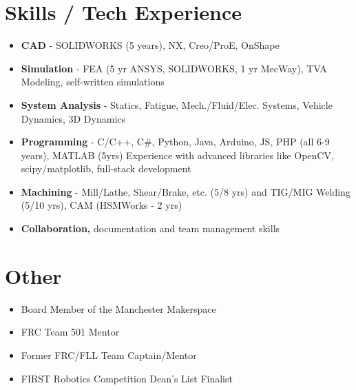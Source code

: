 \documentclass[9pt]{article}
\begin{document}
\vspace{-17pt}

\section*{Skills / Tech Experience}
\vspace{0pt} 
\begin{itemize} \itemsep -2pt
	\item {\bf CAD} - SOLIDWORKS (5 years), NX, Creo/ProE, OnShape
	\item {\bf Simulation} - FEA (5 yr ANSYS, SOLIDWORKS, 1 yr MecWay), TVA Modeling, self-written simulations
	\item {\bf System Analysis} - Statics, Fatigue, Mech./Fluid/Elec. Systems, Vehicle Dynamics, 3D Dynamics
	\item {\bf Programming} - C/C++, C\#, Python, Java, Arduino, JS, PHP (all 6-9 years), MATLAB (5yrs)
	\subitem Experience with advanced libraries like OpenCV, scipy/matplotlib, full-stack development
	\item {\bf Machining} - Mill/Lathe, Shear/Brake, etc. (5/8 yrs) and TIG/MIG Welding (5/10 yrs), CAM (HSMWorks - 2 yrs)
	\item {\bf Collaboration,} documentation and team management skills
\end{itemize}
\section*{Other} 
\begin{itemize} \itemsep -2pt
	\item Board Member of the Manchester Makerspace	
	\item FRC Team 501 Mentor
	\item Former FRC/FLL Team Captain/Mentor
	\item FIRST Robotics Competition Dean's List Finalist
\end{itemize}

 
\end{document}

